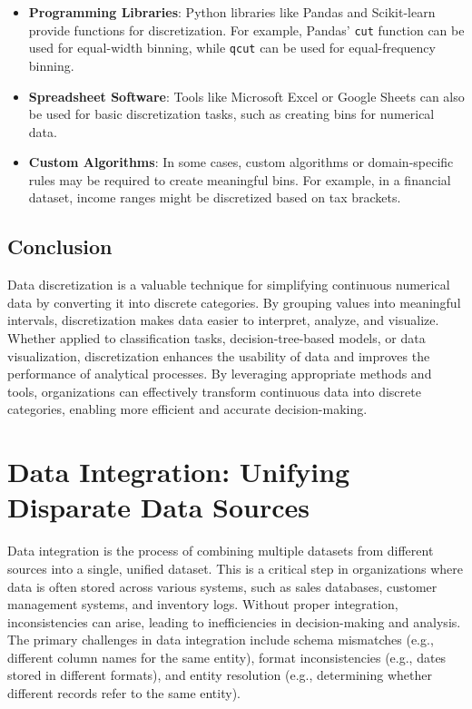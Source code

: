 \documentclass[12pt]{article}
\begin{document}
\begin{itemize}
    \item \textbf{Programming Libraries}: Python libraries like Pandas and Scikit-learn provide functions for discretization. For example, Pandas' \texttt{cut} function can be used for equal-width binning, while \texttt{qcut} can be used for equal-frequency binning.
    \item \textbf{Spreadsheet Software}: Tools like Microsoft Excel or Google Sheets can also be used for basic discretization tasks, such as creating bins for numerical data.
    \item \textbf{Custom Algorithms}: In some cases, custom algorithms or domain-specific rules may be required to create meaningful bins. For example, in a financial dataset, income ranges might be discretized based on tax brackets.
\end{itemize}

\subsection{Conclusion}

Data discretization is a valuable technique for simplifying continuous numerical data by converting it into discrete categories. By grouping values into meaningful intervals, discretization makes data easier to interpret, analyze, and visualize. Whether applied to classification tasks, decision-tree-based models, or data visualization, discretization enhances the usability of data and improves the performance of analytical processes. By leveraging appropriate methods and tools, organizations can effectively transform continuous data into discrete categories, enabling more efficient and accurate decision-making.

\section{Data Integration: Unifying Disparate Data Sources}

Data integration is the process of combining multiple datasets from different sources into a single, unified dataset. This is a critical step in organizations where data is often stored across various systems, such as sales databases, customer management systems, and inventory logs. Without proper integration, inconsistencies can arise, leading to inefficiencies in decision-making and analysis. The primary challenges in data integration include schema mismatches (e.g., different column names for the same entity), format inconsistencies (e.g., dates stored in different formats), and entity resolution (e.g., determining whether different records refer to the same entity).
\end{document}
